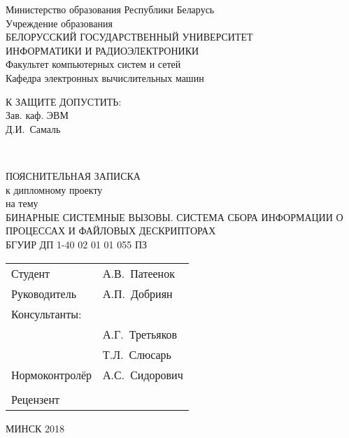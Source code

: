 \begin{titlepage}
  \begin{center}
    Министерство образования Республики Беларусь\\[1em]
    Учреждение образования\\
    БЕЛОРУССКИЙ ГОСУДАРСТВЕННЫЙ УНИВЕРСИТЕТ \\
    ИНФОРМАТИКИ И РАДИОЭЛЕКТРОНИКИ\\[1em]

    Факультет компьютерных систем и сетей \\[0.6cm]

    Кафедра электронных вычислительных машин \\[1.4cm]

    \begin{flushright}
      \begin{minipage}{0.4\textwidth}
        \MakeUppercase{К защите допустить:}\\
        Зав. каф. ЭВМ\\
        \underline{\hspace*{2.8cm}} Д.И.~Самаль
      \end{minipage}\\[3.2em]
    \end{flushright}

    {ПОЯСНИТЕЛЬНАЯ ЗАПИСКА}\\
    {к дипломному проекту}\\
    {на тему}\\
    {\MakeUppercase{Бинарные системные вызовы. Система сбора информации о процессах и файловых дескрипторах}}\\[2em]


    {БГУИР ДП 1-40 02 01 01 055 ПЗ}\\[2em]

    \begin{tabular}{ p{}p{} }
      Студент & А.В.~Патеенок  \\[1em]

      Руководитель & А.П.~Добриян \\[1em]

      Консультанты: &\\[1em]

      \hspace*{6ex}{от кафедры ЭВМ} & А.Г.~Третьяков \\[1em]

      \hspace*{6ex}{по экономической части} & Т.Л.~Слюсарь \\[1em]

      Нормоконтролёр & А.С.~Сидорович\\
      & \\
      Рецензент &
    \end{tabular}

    \vfill
    {\normalsize МИНСК 2018}
  \end{center}
\end{titlepage}
